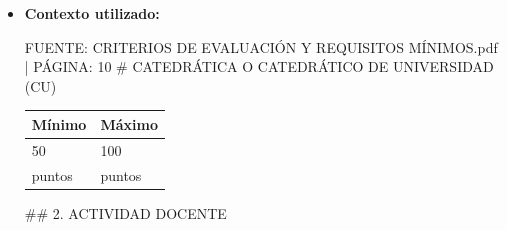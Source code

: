 \documentclass{article}
\begin{document}
\begin{itemize}
\begin{itemize}
                Por ejemplo, si se han impartido 1500 horas de docencia en Máster Universitario Oficial, la puntuación sería:

                * 1500 horas x 1,00 (coeficiente por hora de docencia) = 150 puntos
                * Factor de escala: 1200/1500 = 0,8
                * Puntuación final: 150 x 0,8 = 120 puntos

                Sin embargo, como el máximo de puntos para este apartado es de 50, la puntuación final sería de 50 puntos.

                Es importante tener en cuenta que la puntuación final dependerá de la evaluación de la comisión y del baremo establecido por la Universidad de Sevilla. Es recomendable consultar el baremo y las instrucciones de evaluación para obtener más información sobre el cálculo de puntos y los criterios de evaluación.
          \item \textbf{Contexto utilizado:}
                \begin{scriptsize}
                  FUENTE: CRITERIOS DE EVALUACIÓN Y REQUISITOS MÍNIMOS.pdf | PÁGINA: 10
                  \# CATEDRÁTICA O CATEDRÁTICO DE UNIVERSIDAD (CU)

                  \vspace{0.4cm}
                  \begin{table}[h!]\centering\renewcommand{\arraystretch}{1.3}
                    \begin{tabular}{|p{}|p{}|}\hline
                      Mínimo & Máximo \\\hline
                      50     & 100    \\\hline
                      puntos & puntos \\\hline
                    \end{tabular}\end{table}
                  \vspace{0.4cm}

                  \#\# 2. ACTIVIDAD DOCENTE


\end{scriptsize}
\end{itemize}
\end{itemize}
\end{document}
